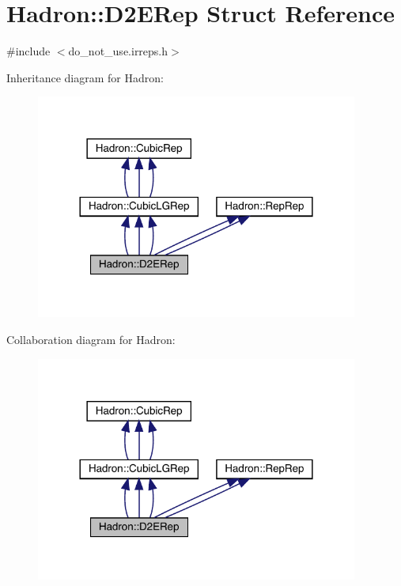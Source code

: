 \hypertarget{structHadron_1_1D2ERep}{}\section{Hadron\+:\+:D2\+E\+Rep Struct Reference}
\label{structHadron_1_1D2ERep}


{\ttfamily \#include $<$do\+\_\+not\+\_\+use.\+irreps.\+h$>$}



Inheritance diagram for Hadron\+:
\nopagebreak
\begin{figure}[H]
\begin{center}
\leavevmode
\includegraphics[width=300pt]{dc/dcb/structHadron_1_1D2ERep__inherit__graph}
\end{center}
\end{figure}


Collaboration diagram for Hadron\+:
\nopagebreak
\begin{figure}[H]
\begin{center}
\leavevmode
\includegraphics[width=300pt]{d7/d17/structHadron_1_1D2ERep__coll__graph}
\end{center}
\end{figure}
